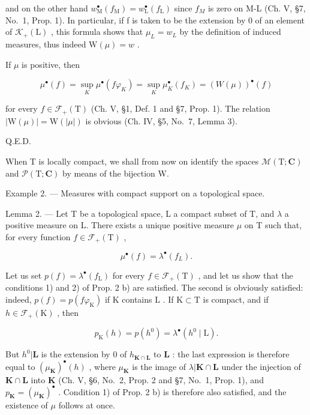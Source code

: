 and on the other hand \(w_{\mathrm{M}}^{\bullet}(f_{\mathrm{M}}) = w_{\mathrm{L}}^{\bullet}(f_{\mathrm{L}})\) since \(f_{M}\) is zero on M-L (Ch. V, §7, No.~1, Prop. 1). In particular, if f is taken to be the extension by 0 of an element of \(\mathcal{K}_{+}(\mathrm{L})\) , this formula shows that \(\mu_{L} = w_{L}\) by the definition of induced measures, thus indeed \(\mathrm{W}(\mu) = w\) .

If \(\mu\) is positive, then

\[
\mu^ {\bullet} (f) = \sup _ {K} \mu^ {\bullet} (f \varphi_ {K}) = \sup _ {K} \mu_ {K} ^ {\bullet} (f _ {K}) = (W (\mu)) ^ {\bullet} (f)
\]

for every \(f \in \mathcal{F}_{+}(\mathrm{T})\) (Ch. V, §1, Def. 1 and §7, Prop. 1). The relation \(|\mathrm{W}(\mu)| = \mathrm{W}(|\mu|)\) is obvious (Ch. IV, §5, No.~7, Lemma 3).

Q.E.D.

When T is locally compact, we shall from now on identify the spaces \(\mathcal{M}(\mathrm{T};\mathbf{C})\) and \(\mathcal{P}(\mathrm{T};\mathbf{C})\) by means of the bijection W.

Example 2. --- Measures with compact support on a topological space.

Lemma 2. --- Let T be a topological space, L a compact subset of T, and \(\lambda\) a positive measure on L. There exists a unique positive measure \(\mu\) on T such that, for every function \(f \in \mathcal{F}_{+}(\mathrm{T})\) ,

\[
\mu^ {\bullet} (f) = \lambda^ {\bullet} (f _ {L}).\tag{2}
\]

Let us set \(p(f) = \lambda^{\bullet}(f_{\mathrm{L}})\) for every \(f \in \mathcal{F}_{+}(\mathrm{T})\) , and let us show that the conditions 1) and 2) of Prop. 2 b) are satisfied. The second is obviously satisfied: indeed, \(p(f) = p(f\varphi_{\mathrm{K}})\) if \(\mathrm{K}\) contains \(\mathrm{L}\) . If \(\mathrm{K} \subset \mathrm{T}\) is compact, and if \(h \in \mathcal{F}_{+}(\mathrm{K})\) , then

\[
p _ {\mathrm{K}} (h) = p \left(h ^ {0}\right) = \lambda^ {\bullet} \left(h ^ {0} \mid \mathrm{L}\right).
\]

But \(h^0 | \mathbf{L}\) is the extension by 0 of \(h_{\mathbf{K} \cap \mathbf{L}}\) to \(\mathbf{L}\) : the last expression is therefore equal to \((\mu_{\mathbf{K}})^{\bullet}(h)\) , where \(\mu_{\mathbf{K}}\) is the image of \(\lambda | \mathbf{K} \cap \mathbf{L}\) under the injection of \(\mathbf{K} \cap \mathbf{L}\) into \(\mathbf{K}\) (Ch. V, §6, No.~2, Prop. 2 and §7, No.~1, Prop. 1), and \(p_{\mathbf{K}} = (\mu_{\mathbf{K}})^{\bullet}\) . Condition 1) of Prop. 2 b) is therefore also satisfied, and the existence of \(\mu\) follows at once.

